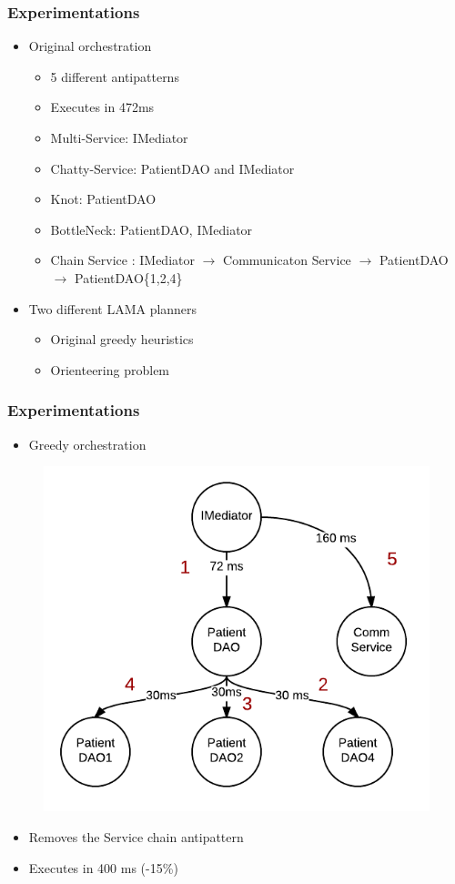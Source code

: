 \documentclass{beamer}
\begin{document}
\begin{frame}
\frametitle{Experimentations}

\begin{itemize}
\item Original orchestration
\begin{itemize}
\item 5 different antipatterns
\item Executes in 472ms
\item Multi-Service: IMediator
\item Chatty-Service: PatientDAO and IMediator
\item Knot: PatientDAO
\item BottleNeck: PatientDAO, IMediator
\item Chain Service : IMediator $\rightarrow$ Communicaton Service $\rightarrow$ PatientDAO $\rightarrow$ PatientDAO\{1,2,4\}
\end{itemize}
\item Two different LAMA planners
\begin{itemize}
\item Original greedy heuristics
\item Orienteering problem
\end{itemize}
\end{itemize}
\end{frame}

\begin{frame}
\frametitle{Experimentations}
\begin{itemize}
\item Greedy
orchestration
\end{itemize}
\begin{figure}
    \centering
	\includegraphics[scale=0.3]{media/scenario2.png}
\end{figure}
\begin{itemize}
\item Removes the Service chain antipattern
\item Executes in 400 ms (-15\%)
\end{itemize}
\end{frame}
\end{document}
